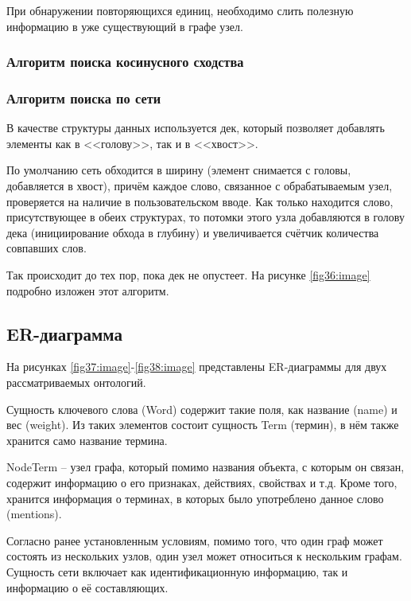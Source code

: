 При обнаружении повторяющихся единиц, необходимо слить полезную информацию в уже существующий в графе узел.


\newpage

\subsubsection{Алгоритм поиска косинусного сходства}

\subsubsection{Алгоритм поиска по сети}
В качестве структуры данных используется дек, который позволяет добавлять элементы как в <<голову>>, так и в <<хвост>>. 

По умолчанию сеть обходится в ширину (элемент снимается с головы, добавляется в хвост), причём каждое слово, связанное с обрабатываемым узел, проверяется на наличие в пользовательском вводе. Как только находится слово, присутствующее в обеих структурах, то потомки этого узла добавляются в голову дека (инициирование обхода в глубину) и увеличивается счётчик количества совпавших  слов.

Так происходит до тех пор, пока дек не опустеет. На рисунке \ref{fig36:image} подробно изложен этот алгоритм.

\newpage

\subsection{ER-диаграмма}
На рисунках \ref{fig37:image}-\ref{fig38:image} представлены ER-диаграммы для двух рассматриваемых онтологий. 

Сущность ключевого слова (Word) содержит такие поля, как название (name) и вес (weight). Из таких элементов состоит сущность Term (термин), в нём также хранится само название термина.

NodeTerm -- узел графа, который помимо названия объекта, с которым он связан, содержит информацию о его признаках, действиях, свойствах и т.д. Кроме того, хранится информация о терминах, в которых было употреблено данное слово (mentions). 

Согласно ранее установленным условиям, помимо того, что один граф может состоять из нескольких узлов, один узел может относиться к нескольким графам. 
Сущность сети включает как идентификационную информацию, так и информацию о её составляющих.


\newpage


